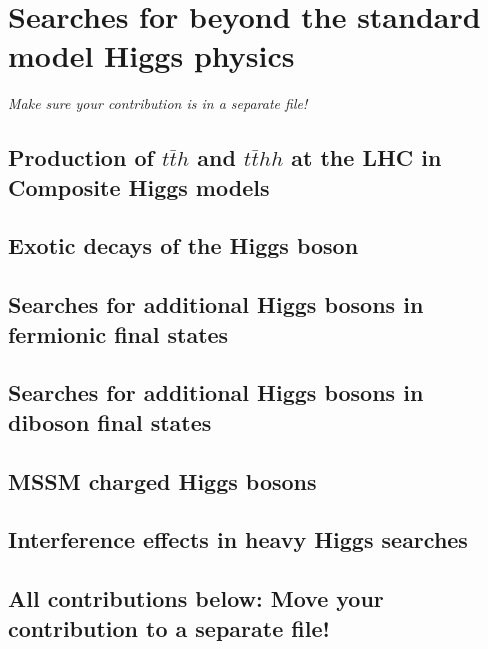 \documentclass[../report.tex]{subfiles}
\providecommand{\main}{..}
\begin{document}
\section{Searches for beyond the standard model Higgs physics}

\emph{Make sure your contribution is in a separate file!}

%

\subsection{Production of $t\bar{t}h$ and $t\bar{t}h h$ at the LHC in Composite Higgs models}


\subsection{Exotic decays of the Higgs boson}





\subsection{Searches for additional Higgs bosons in fermionic final states}




\subsection{Searches for additional Higgs bosons in diboson final states}


\subsection{MSSM charged Higgs bosons}


\subsection{Interference effects in heavy Higgs searches}


\clearpage

\vspace{5cm}
\subsection{All contributions below: Move your contribution to a separate file!}
\end{document}
